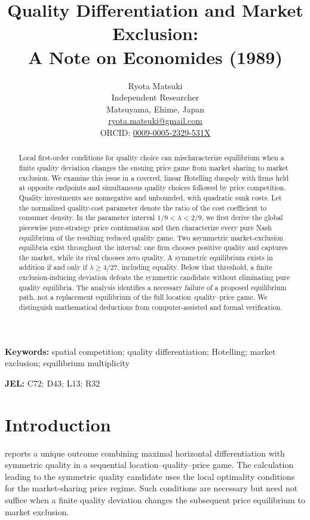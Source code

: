 \documentclass[11pt]{article}
\title{Quality Differentiation and Market Exclusion:\\A Note on Economides (1989)}
\author{Ryota Matsuki\\Independent Researcher\\Matsuyama, Ehime, Japan\\\href{mailto:ryota.matsuki@gmail.com}{ryota.matsuki@gmail.com}\\ORCID: \href{https://orcid.org/0009-0005-2329-531X}{0009-0005-2329-531X}}
\date{}
\begin{document}
\maketitle
\begin{abstract}
Local first-order conditions for quality choice can
mischaracterize equilibrium when a finite quality
deviation changes the ensuing price game from market
sharing to market exclusion. We examine this issue in
a covered, linear Hotelling duopoly with firms held
at opposite endpoints and simultaneous quality
choices followed by price competition. Quality
investments are nonnegative and unbounded, with
quadratic sunk costs. Let the normalized quality-cost
parameter denote the ratio of the cost coefficient
to consumer density. In the parameter interval
$1/9<\lambda<2/9$, we first derive the global
piecewise pure-strategy price continuation and then
characterize every pure Nash equilibrium of the
resulting reduced quality game. Two asymmetric
market-exclusion equilibria exist throughout the
interval: one firm chooses positive quality and
captures the market, while its rival chooses zero
quality. A symmetric equilibrium exists in addition
if and only if $\lambda\geq4/27$, including
equality. Below that threshold, a finite
exclusion-inducing deviation defeats the symmetric
candidate without eliminating pure quality
equilibria. The analysis identifies a necessary
failure of a proposed equilibrium path, not a
replacement equilibrium of the full
location--quality--price game. We distinguish
mathematical deductions from computer-assisted
and formal verification.
\end{abstract}
\noindent\textbf{Keywords:} spatial competition; quality differentiation; Hotelling;
market exclusion; equilibrium multiplicity

\medskip
\noindent\textbf{JEL:} C72; D43; L13; R32

\section{Introduction}\label{sec:intro}
\citet[pp.~27--28, eqs.~(8)--(9) and Theorem~2]{Economides1989}
reports a unique outcome combining maximal horizontal
differentiation with symmetric quality in a sequential
location--quality--price game. The calculation leading to the
symmetric quality candidate uses the local optimality
conditions for the market-sharing price regime. Such
conditions are necessary but need not suffice when a
finite quality deviation changes the subsequent price
equilibrium to market exclusion.
\end{document}
